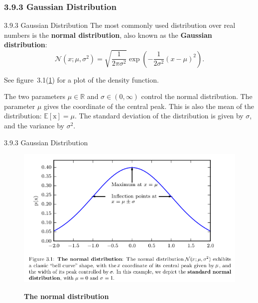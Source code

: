 \subsubsection{3.9.3 Gaussian Distribution}
\begin{frame}{3.9.3 Gaussian Distribution}
    \justifying
    The most commonly used distribution over real numbers is the \textbf{normal distribution}, also known as the \textbf{Gaussian distribution}:
    \begin{equation}
        \mathcal{N}(x; \mu, \sigma^{2}) = \sqrt{\frac{1}{2\pi\sigma^{2}}} \exp\left(-\frac{1}{2\sigma^{2}} (x - \mu)^{2}\right).
        \label{eq:3_21}
    \end{equation}
    
    See figure~3.1(\ref{fig:3_1the_normal_distribution}) for a plot of the density function.
    
    The two parameters $\mu \in \mathbb{R}$ and $\sigma \in (0, ∞)$ control the normal distribution. The parameter $\mu$ gives the coordinate of the central peak. This is also the mean of the distribution: $\mathbb{E}[\mathrm{x}] = \mu$. The standard deviation of the distribution is given by $\sigma$, and the variance by $\sigma^{2}$.
\end{frame}

\begin{frame}{3.9.3 Gaussian Distribution}
    \begin{figure}
        \centering
        \includegraphics[scale=0.45]{images/3-1-gaussian_distribution.png}
        \label{fig:3_1the_normal_distribution}
        \caption{\textbf{The normal distribution}}
    \end{figure}
\end{frame}

